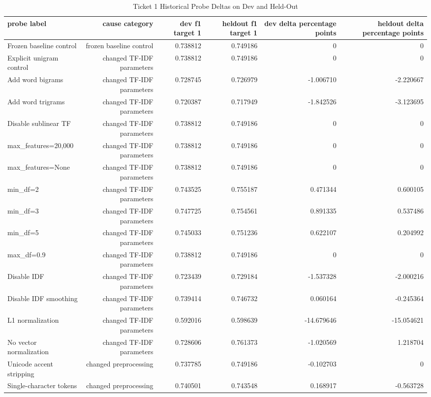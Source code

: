 \begin{table}[t]
\centering
\caption{Ticket 1 Historical Probe Deltas on Dev and Held-Out}
\label{tab:ticket1_probe_ledger}
\begin{adjustbox}{max width=\textwidth}
\scriptsize
\begin{tabular}{lrrrrr}
\hline
probe label & cause category & dev f1 target 1 & heldout f1 target 1 & dev delta percentage points & heldout delta percentage points \\
\hline
Frozen baseline control & frozen baseline control & 0.738812 & 0.749186 & 0 & 0 \\
Explicit unigram control & changed TF-IDF parameters & 0.738812 & 0.749186 & 0 & 0 \\
Add word bigrams & changed TF-IDF parameters & 0.728745 & 0.726979 & -1.006710 & -2.220667 \\
Add word trigrams & changed TF-IDF parameters & 0.720387 & 0.717949 & -1.842526 & -3.123695 \\
Disable sublinear TF & changed TF-IDF parameters & 0.738812 & 0.749186 & 0 & 0 \\
max\_features=20,000 & changed TF-IDF parameters & 0.738812 & 0.749186 & 0 & 0 \\
max\_features=None & changed TF-IDF parameters & 0.738812 & 0.749186 & 0 & 0 \\
min\_df=2 & changed TF-IDF parameters & 0.743525 & 0.755187 & 0.471344 & 0.600105 \\
min\_df=3 & changed TF-IDF parameters & 0.747725 & 0.754561 & 0.891335 & 0.537486 \\
min\_df=5 & changed TF-IDF parameters & 0.745033 & 0.751236 & 0.622107 & 0.204992 \\
max\_df=0.9 & changed TF-IDF parameters & 0.738812 & 0.749186 & 0 & 0 \\
Disable IDF & changed TF-IDF parameters & 0.723439 & 0.729184 & -1.537328 & -2.000216 \\
Disable IDF smoothing & changed TF-IDF parameters & 0.739414 & 0.746732 & 0.060164 & -0.245364 \\
L1 normalization & changed TF-IDF parameters & 0.592016 & 0.598639 & -14.679646 & -15.054621 \\
No vector normalization & changed TF-IDF parameters & 0.728606 & 0.761373 & -1.020569 & 1.218704 \\
Unicode accent stripping & changed preprocessing & 0.737785 & 0.749186 & -0.102703 & 0 \\
Single-character tokens & changed preprocessing & 0.740501 & 0.743548 & 0.168917 & -0.563728 \\

\end{tabular}
\end{adjustbox}
\end{table}
